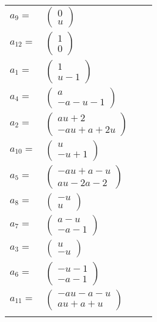 \documentclass[1p]{elsarticle_modified}
\theoremstyle{definition}
\begin{document}
\begin{tabular}{m{7pt} m{180pt} m{7pt} m{180pt} }
\flushright $a_{9}=$&$\begin{pmatrix}0\\u\end{pmatrix}$ \\
\flushright $a_{12}=$&$\begin{pmatrix}1\\0\end{pmatrix}$ \\
\flushright $a_{1}=$&$\begin{pmatrix}1\\u-1\end{pmatrix}$ \\
\flushright $a_{4}=$&$\begin{pmatrix}a\\- a- u-1\end{pmatrix}$ \\
\flushright $a_{2}=$&$\begin{pmatrix}a u+2\\- a u+a+2 u\end{pmatrix}$ \\
\flushright $a_{10}=$&$\begin{pmatrix}u\\- u+1\end{pmatrix}$ \\
\flushright $a_{5}=$&$\begin{pmatrix}- a u+a- u\\a u-2 a-2\end{pmatrix}$ \\
\flushright $a_{8}=$&$\begin{pmatrix}- u\\u\end{pmatrix}$ \\
\flushright $a_{7}=$&$\begin{pmatrix}a- u\\- a-1\end{pmatrix}$ \\
\flushright $a_{3}=$&$\begin{pmatrix}u\\- u\end{pmatrix}$ \\
\flushright $a_{6}=$&$\begin{pmatrix}- u-1\\- a-1\end{pmatrix}$ \\
\flushright $a_{11}=$&$\begin{pmatrix}- a u- a- u\\a u+a+u\end{pmatrix}$\\&\end{tabular}
\end{document}
